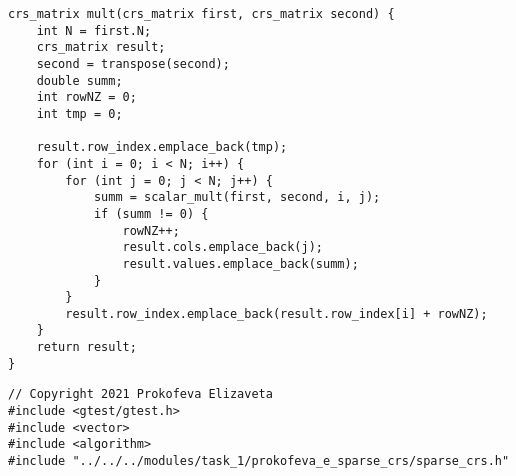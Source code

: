 \documentclass{report}
\begin{document}
\begin{lstlisting}
crs_matrix mult(crs_matrix first, crs_matrix second) {
    int N = first.N;
    crs_matrix result;
    second = transpose(second);
    double summ;
    int rowNZ = 0;
    int tmp = 0;

    result.row_index.emplace_back(tmp);
    for (int i = 0; i < N; i++) {
        for (int j = 0; j < N; j++) {
            summ = scalar_mult(first, second, i, j);
            if (summ != 0) {
                rowNZ++;
                result.cols.emplace_back(j);
                result.values.emplace_back(summ);
            }
        }
        result.row_index.emplace_back(result.row_index[i] + rowNZ);
    }
    return result;
}

\end{lstlisting}
\begin{lstlisting}
// Copyright 2021 Prokofeva Elizaveta
#include <gtest/gtest.h>
#include <vector>
#include <algorithm>
#include "../../../modules/task_1/prokofeva_e_sparse_crs/sparse_crs.h"



\end{lstlisting}
\end{document}
